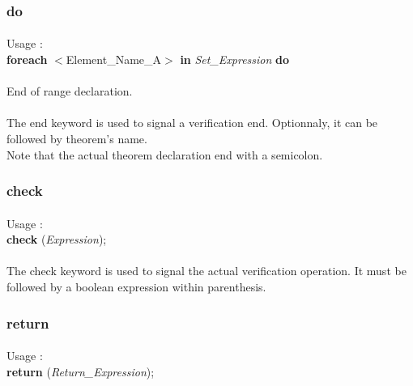 \subsubsection {do}
\paragraph{}
Usage :\\
\textbf {foreach} $<$Element\_Name\_A$>$ \textbf{in} \textit{Set\_Expression} \textbf{do}\\

\paragraph{}
End of range declaration.

\paragraph{}
The end keyword is used to signal a verification end. 
Optionnaly, it can be followed by theorem's name.\\
Note that the actual theorem declaration end with a 
semicolon.

\subsubsection {check}
\paragraph{}
Usage :\\
\textbf {check} (\textit{Expression});

\paragraph{}
The check keyword is used to signal the actual verification 
operation. It must be followed by a boolean expression within 
parenthesis.\\

\subsubsection {return}
\paragraph{}
Usage :\\
\textbf {return} (\textit{Return\_Expression});

